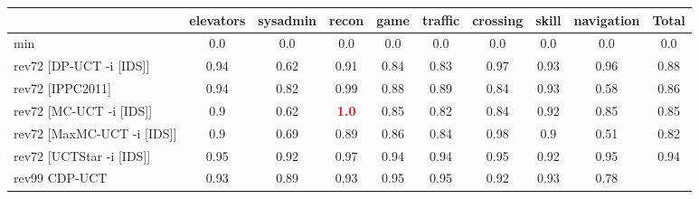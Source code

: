 \documentclass{article}
\begin{document}
\begin{tabular}{|l|r@{$\pm$}rr@{$\pm$}rr@{$\pm$}rr@{$\pm$}rr@{$\pm$}rr@{$\pm$}rr@{$\pm$}rr@{$\pm$}rr@{$\pm$}r|}
\hline

& \multicolumn{2}{c}{elevators}
& \multicolumn{2}{c}{sysadmin}
& \multicolumn{2}{c}{recon}
& \multicolumn{2}{c}{game}
& \multicolumn{2}{c}{traffic}
& \multicolumn{2}{c}{crossing}
& \multicolumn{2}{c}{skill}
& \multicolumn{2}{c}{navigation}
& \multicolumn{2}{c|}{Total}
\\
\hline
\hline
min
& \multicolumn{2}{c}{0.0}
& \multicolumn{2}{c}{0.0}
& \multicolumn{2}{c}{0.0}
& \multicolumn{2}{c}{0.0}
& \multicolumn{2}{c}{0.0}
& \multicolumn{2}{c}{0.0}
& \multicolumn{2}{c}{0.0}
& \multicolumn{2}{c}{0.0}
& \multicolumn{2}{c|}{0.0}
\\
rev72 [DP-UCT -i [IDS]]
& \multicolumn{2}{c}{0.94}
& \multicolumn{2}{c}{0.62}
& \multicolumn{2}{c}{0.91}
& \multicolumn{2}{c}{0.84}
& \multicolumn{2}{c}{0.83}
& \multicolumn{2}{c}{0.97}
& \multicolumn{2}{c}{0.93}
& \multicolumn{2}{c}{0.96}
& \multicolumn{2}{c|}{0.88}
\\
rev72 [IPPC2011]
& \multicolumn{2}{c}{0.94}
& \multicolumn{2}{c}{0.82}
& \multicolumn{2}{c}{0.99}
& \multicolumn{2}{c}{0.88}
& \multicolumn{2}{c}{0.89}
& \multicolumn{2}{c}{0.84}
& \multicolumn{2}{c}{0.93}
& \multicolumn{2}{c}{0.58}
& \multicolumn{2}{c|}{0.86}
\\
rev72 [MC-UCT -i [IDS]]
& \multicolumn{2}{c}{0.9}
& \multicolumn{2}{c}{0.62}
& \multicolumn{2}{c}{\textbf{\textcolor{red}{1.0}}}
& \multicolumn{2}{c}{0.85}
& \multicolumn{2}{c}{0.82}
& \multicolumn{2}{c}{0.84}
& \multicolumn{2}{c}{0.92}
& \multicolumn{2}{c}{0.85}
& \multicolumn{2}{c|}{0.85}
\\
rev72 [MaxMC-UCT -i [IDS]]
& \multicolumn{2}{c}{0.9}
& \multicolumn{2}{c}{0.69}
& \multicolumn{2}{c}{0.89}
& \multicolumn{2}{c}{0.86}
& \multicolumn{2}{c}{0.84}
& \multicolumn{2}{c}{0.98}
& \multicolumn{2}{c}{0.9}
& \multicolumn{2}{c}{0.51}
& \multicolumn{2}{c|}{0.82}
\\
rev72 [UCTStar -i [IDS]]
& \multicolumn{2}{c}{0.95}
& \multicolumn{2}{c}{0.92}
& \multicolumn{2}{c}{0.97}
& \multicolumn{2}{c}{0.94}
& \multicolumn{2}{c}{0.94}
& \multicolumn{2}{c}{0.95}
& \multicolumn{2}{c}{0.92}
& \multicolumn{2}{c}{0.95}
& \multicolumn{2}{c|}{0.94}
\\
\hline
rev99 CDP-UCT
& \multicolumn{2}{c}{0.93}
& \multicolumn{2}{c}{0.89}
& \multicolumn{2}{c}{0.93}
& \multicolumn{2}{c}{0.95}
& \multicolumn{2}{c}{0.95}
& \multicolumn{2}{c}{0.92}
& \multicolumn{2}{c}{0.93}
& \multicolumn{2}{c}{0.78}

\end{tabular}
\end{document}
